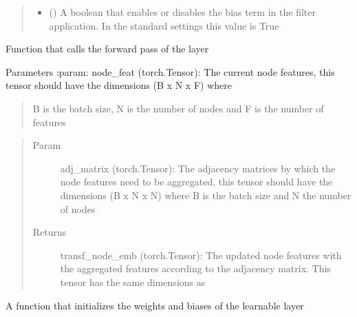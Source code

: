 \documentclass[letterpaper,10pt,english]{sphinxmanual}
\begin{document}
\begin{fulllineitems}
\begin{quote}
\begin{description}
\begin{itemize}
\item {} 
\sphinxstyleliteralstrong{\sphinxupquote{(}}\sphinxstyleliteralstrong{\sphinxupquote{, }}\sphinxstyleliteralstrong{\sphinxupquote{)}} () \textendash{} A boolean that enables or disables the bias term in the filter application. In the standard settings
this value is True

\end{itemize}

\end{description}\end{quote}

\begin{fulllineitems}
\label{\detokenize{modules/gqcml.nn:gqcml.nn.layers.GraphConv.forward}}
Function that calls the forward pass of the layer

Parameters
:param: node\_feat (torch.Tensor): The current node features, this tensor should have the dimensions (B x N x F) where
\begin{quote}

B is the batch size, N is the number of nodes and F is the number of features
\end{quote}
\begin{quote}\begin{description}
\item[{Param}] \leavevmode
adj\_matrix (torch.Tensor): The adjacency matrices by which the node features need to be aggregated, this tensor
should have the dimensions (B x N x N) where B is the batch size and N the number of nodes

\item[{Returns}] \leavevmode
transf\_node\_emb (torch.Tensor): The updated node features with the aggregated features according to the adjacency
matrix. This tensor has the same dimensions as

\end{description}\end{quote}

\end{fulllineitems}


\begin{fulllineitems}
\label{\detokenize{modules/gqcml.nn:gqcml.nn.layers.GraphConv.reset_parameters}}
A function that initializes the weights and biases of the learnable layer

\end{fulllineitems}


\end{fulllineitems}
\end{document}
